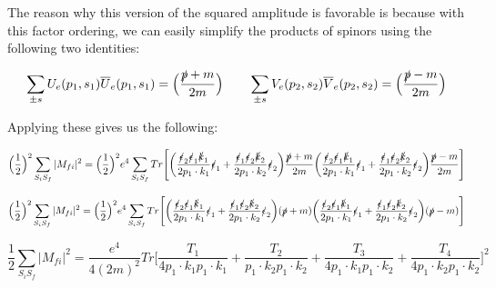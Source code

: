 \documentclass[a4]{article}
\begin{document}
    The reason why this version of the squared amplitude is favorable is because with this factor ordering, we can easily simplify the products of spinors using the following two identities:

    \begin{equation}
        \sum_{\pm s} U_e (p_1, s_1) \overline{U}_e (p_1, s_1) = \Big( \frac{\slashed{p} + m}{2m} \Big) \qquad \sum_{\pm s} V_e (p_2, s_2) \overline{V}_e (p_2, s_2) = \Big( \frac{\slashed{p} - m}{2m} \Big)
    \end{equation}

    Applying these gives us the following:

    \begin{equation}
        \Big( \frac{1}{2} \Big)^2 \sum_{S_i S_f} |M_{fi}|^2 = \Big( \frac{1}{2} \Big)^2 e^4 \sum_{S_i S_f} Tr \Bigg[ \bigg( \frac{\slashed{\epsilon}_2 \slashed{\epsilon}_1 \slashed{k}_1}{2 p_1 \cdot k_1} \slashed{\epsilon}_1  + \frac{\slashed{\epsilon}_1 \slashed{\epsilon}_2 \slashed{k}_2}{2 p_1 \cdot k_2} \slashed{\epsilon}_2 \bigg) \frac{\slashed{p} + m}{2m} \bigg( \frac{\slashed{\epsilon}_2 \slashed{\epsilon}_1 \slashed{k}_1}{2 p_1 \cdot k_1} \slashed{\epsilon}_1  + \frac{\slashed{\epsilon}_1 \slashed{\epsilon}_2 \slashed{k}_2}{2 p_1 \cdot k_2} \slashed{\epsilon}_2 \bigg) \frac{\slashed{p} - m}{2m} \Bigg]
    \end{equation}

    \begin{equation}
        \Big( \frac{1}{2} \Big)^2 \sum_{S_i S_f} |M_{fi}|^2 = \Big( \frac{1}{2} \Big)^2 e^4 \sum_{S_i S_f} Tr \Bigg[ \bigg( \frac{\slashed{\epsilon}_2 \slashed{\epsilon}_1 \slashed{k}_1}{2 p_1 \cdot k_1} \slashed{\epsilon}_1  + \frac{\slashed{\epsilon}_1 \slashed{\epsilon}_2 \slashed{k}_2}{2 p_1 \cdot k_2} \slashed{\epsilon}_2 \bigg) (\slashed{p} + m) \bigg( \frac{\slashed{\epsilon}_2 \slashed{\epsilon}_1 \slashed{k}_1}{2 p_1 \cdot k_1} \slashed{\epsilon}_1  + \frac{\slashed{\epsilon}_1 \slashed{\epsilon}_2 \slashed{k}_2}{2 p_1 \cdot k_2} \slashed{\epsilon}_2 \bigg) (\slashed{p} - m) \Bigg]
    \end{equation}

    \begin{equation}
        \frac{1}{2} \sum_{S_i S_f} |M_{fi}|^2 = \frac{e^4}{4 (2m)^2} Tr \Bigg[ \frac{T_1}{4 p_1 \cdot k_1 p_1 \cdot k_1} + \frac{T_2}{p_1 \cdot k_2 p_1 \cdot k_2} + \frac{T_3}{4 p_1 \cdot k_1 p_1 \cdot k_2} + \frac{T_4}{4 p_1 \cdot k_2 p_1 \cdot k_2} \Bigg]^2
    \end{equation}
\end{document}
